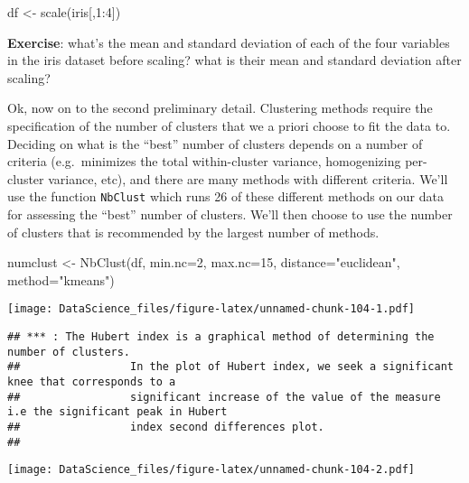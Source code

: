 \documentclass[
]{book}
\newenvironment{Shaded}{\begin{snugshade}}{\end{snugshade}}
\newcommand{\AttributeTok}[1]{\textcolor[rgb]{0.77,0.63,0.00}{#1}}
\newcommand{\DecValTok}[1]{\textcolor[rgb]{0.00,0.00,0.81}{#1}}
\newcommand{\FunctionTok}[1]{\textcolor[rgb]{0.00,0.00,0.00}{#1}}
\newcommand{\NormalTok}[1]{#1}
\newcommand{\OtherTok}[1]{\textcolor[rgb]{0.56,0.35,0.01}{#1}}
\newcommand{\SpecialCharTok}[1]{\textcolor[rgb]{0.00,0.00,0.00}{#1}}
\newcommand{\StringTok}[1]{\textcolor[rgb]{0.31,0.60,0.02}{#1}}
\begin{document}
\begin{Shaded}
\begin{Highlighting}[]
\NormalTok{df }\OtherTok{\textless{}{-}} \FunctionTok{scale}\NormalTok{(iris[,}\DecValTok{1}\SpecialCharTok{:}\DecValTok{4}\NormalTok{])}
\end{Highlighting}
\end{Shaded}

\textbf{Exercise}: what's the mean and standard deviation of each of the four variables in the iris dataset before scaling? what is their mean and standard deviation after scaling?

Ok, now on to the second preliminary detail. Clustering methods require the specification of the number of clusters that we a priori choose to fit the data to. Deciding on what is the ``best'' number of clusters depends on a number of criteria (e.g.~minimizes the total within-cluster variance, homogenizing per-cluster variance, etc), and there are many methods with different criteria. We'll use the function \texttt{NbClust} which runs 26 of these different methods on our data for assessing the ``best'' number of clusters. We'll then choose to use the number of clusters that is recommended by the largest number of methods.

\begin{Shaded}
\begin{Highlighting}[]
\NormalTok{numclust }\OtherTok{\textless{}{-}} \FunctionTok{NbClust}\NormalTok{(df, }\AttributeTok{min.nc=}\DecValTok{2}\NormalTok{, }\AttributeTok{max.nc=}\DecValTok{15}\NormalTok{, }\AttributeTok{distance=}\StringTok{"euclidean"}\NormalTok{, }\AttributeTok{method=}\StringTok{"kmeans"}\NormalTok{)}
\end{Highlighting}
\end{Shaded}

\texttt{[image: DataScience\_files/figure-latex/unnamed-chunk-104-1.pdf]}

\begin{verbatim}
## *** : The Hubert index is a graphical method of determining the number of clusters.
##                 In the plot of Hubert index, we seek a significant knee that corresponds to a 
##                 significant increase of the value of the measure i.e the significant peak in Hubert
##                 index second differences plot. 
## 
\end{verbatim}

\texttt{[image: DataScience\_files/figure-latex/unnamed-chunk-104-2.pdf]}
\end{document}
